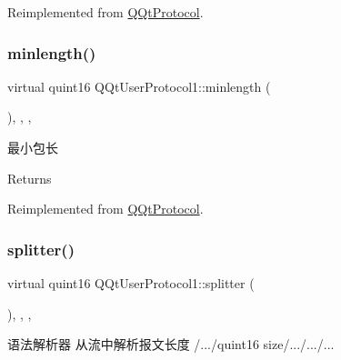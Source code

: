 Reimplemented from \mbox{\hyperlink{class_q_qt_protocol_af41bc3116abbbcfc9af45e151a253ff7}{Q\+Qt\+Protocol}}.

\mbox{\label{class_q_qt_user_protocol1_a7e59f61f8f516fae3d73a71db2931af3}} 
\subsubsection{\texorpdfstring{minlength()}{minlength()}}
{\footnotesize\ttfamily virtual quint16 Q\+Qt\+User\+Protocol1\+::minlength (\begin{DoxyParamCaption}{ }\end{DoxyParamCaption})\hspace{0.3cm}{\ttfamily [inline]}, {\ttfamily [override]}, {\ttfamily [protected]}, {\ttfamily [virtual]}}



最小包长 

\begin{DoxyReturn}{Returns}

\end{DoxyReturn}


Reimplemented from \mbox{\hyperlink{class_q_qt_protocol_a2b00f53d3dd0eed817eeecff422891f3}{Q\+Qt\+Protocol}}.

\mbox{\label{class_q_qt_user_protocol1_acbe588598a606864be1b8efc83f92baf}} 
\subsubsection{\texorpdfstring{splitter()}{splitter()}}
{\footnotesize\ttfamily virtual quint16 Q\+Qt\+User\+Protocol1\+::splitter (\begin{DoxyParamCaption}\item[{const Q\+Byte\+Array \&}]{ }\end{DoxyParamCaption})\hspace{0.3cm}{\ttfamily [inline]}, {\ttfamily [override]}, {\ttfamily [protected]}, {\ttfamily [virtual]}}



语法解析器 从流中解析报文长度 /.../quint16 size/.../.../... 


